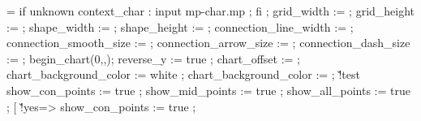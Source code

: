 {   \edef\@@FLOLrulethickness{\the\scratchdimen}%
   \ifdim\@@FLOLradius<2.5\scratchdimen
     \scratchdimen=2.5\scratchdimen
     \edef\@@FLOLradius{\the\scratchdimen}%
     \ifdim\@@FLOLradius>\@@FLOWdx
       \scratchdimen=\@@FLOWdx
       \edef\@@FLOLradius{\the\scratchdimen}%
     \fi
     \ifdim\@@FLOLradius>\@@FLOWdy
       \scratchdimen=\@@FLOWdy
       \edef\@@FLOLradius{\the\scratchdimen}%
     \fi
   \else
     \scratchdimen=\@@FLOLradius
     \edef\@@FLOLradius{\the\scratchdimen}%
   \fi
   \processaction %
     [\@@FLOWoffset]
     [      \v!none=>\scratchdimen=-2.5\scratchdimen,
         \v!overlay=>\scratchdimen=-2.5\scratchdimen,
       \v!standard=>\scratchdimen=\scratchdimen,
         \s!unknown=>\scratchdimen=\@@FLOWoffset,
         \s!default=>\scratchdimen=-2.5\scratchdimen]%
   \edef\@@FLOW@@offset{\the\scratchdimen}%
   \forgetall
   \offinterlineskip
   \resetMPdrawing
   \doglobal\newcounter\FLOWcomment
   \startMPdrawing
     if unknown context_char : input mp-char.mp ; fi ;
     grid_width             := \FLOWgridwidth ;
     grid_height            := \FLOWgridheight ;
     shape_width            := \FLOWshapewidth ;
     shape_height           := \FLOWshapeheight ;
     connection_line_width  := \@@FLOLrulethickness ;
     connection_smooth_size := \@@FLOLradius ;
     connection_arrow_size  := \@@FLOLradius ;
     connection_dash_size   := \@@FLOLradius ;
     begin_chart(0,\FLOWwidth,\FLOWheight);
     reverse_y := true ;
     chart_offset := \@@FLOW@@offset ;
   \stopMPdrawing
   \doifelsenothing\@@FLOWbackgroundcolor
     {\startMPdrawing
      chart_background_color := white ;
      \stopMPdrawing}
     {\startMPdrawing
      chart_background_color := \MPcolor{\@@FLOWbackgroundcolor} ;
      \stopMPdrawing}%
   \doif\@@FLOWoption\v!test
     {\startMPdrawing
        show_con_points := true ;
        show_mid_points := true ;
        show_all_points := true ;
      \stopMPdrawing}%
   \processaction %
     [\@@FLOWdot]
     [     \v!yes=>\startMPdrawing
                    show_con_points := true ;
}
